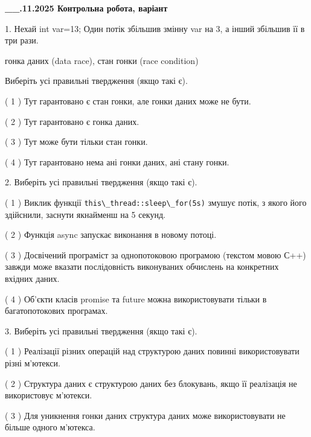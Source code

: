 \documentclass[12pt, ukrainian]{article}
\def\code#1{\Verb!#1!}
\begin{document}
\newpage
\begin {large}

\textbf{\_\_.11.2025 Контрольна робота, варіант  }\par


{
1. Нехай int var=13; Один потік збільшив змінну var на 3, а інший збільшив її в три рази.

гонка даних (data race), стан гонки (race condition)

Виберіть усі правильні твердження (якщо такі є).\par
\vspace{2mm}
( 1 ) Тут гарантовано є стан гонки, але гонки даних може не бути.%

( 2 ) Тут гарантовано є гонка даних.%

( 3 ) Тут може бути тільки стан гонки.%

( 4 ) Тут гарантовано нема ані гонки даних, ані стану гонки.%


2. Виберіть усі правильні твердження (якщо такі є).\par
\vspace{2mm}

( 1 ) Виклик функції \code{this\_thread::sleep\_for(5s)} змушує потік, з якого його здійснили, заснути якнайменш на 5 секунд.%

( 2 ) Функція async запускає виконання в новому потоці.%

( 3 ) Досвічений програміст за однопотоковою програмою (текстом мовою С++) завжди може вказати послідовність виконуваних обчислень на конкретних вхідних даних.%

( 4 ) Об’єкти класів promise та future можна використовувати тільки в багатопотокових програмах.%


3. Виберіть усі правильні твердження (якщо такі є).\par
\vspace{2mm}

( 1 ) Реалізації різних операцій над структурою даних повинні використовувати різні м’ютекси.%

( 2 ) Структура даних є структурою даних без блокувань, якщо її реалізація не використовує м’ютекси.%

( 3 ) Для уникнення гонки даних структура даних може використовувати не більше одного м’ютекса.%

}
\end{large}
\end{document}
